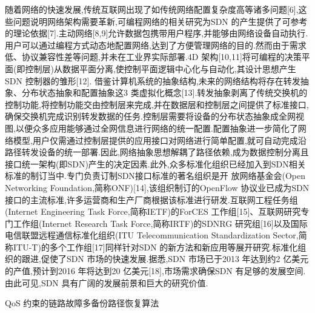 随着网络的快速发展,传统互联网出现了如传统网络配置复杂度高等诸多问题[6],这些问题说明网络架构需要革新,可编程网络的相关研究为SDN 的产生提供了可参考的理论依据[7].主动网络[8,9]允许数据包携带用户程序,并能够由网络设备自动执行.用户可以通过编程方式动态地配置网络,达到了方便管理网络的目的.然而由于需求低、协议兼容性差等问题,并未在工业界实际部署.4D 架构[10,11]将可编程的决策平面(即控制层)从数据平面分离,使控制平面逻辑中心化与自动化,其设计思想产生SDN 控制器的雏形[12].
借鉴计算机系统的抽象结构,未来的网络结构将存在转发抽象、分布状态抽象和配置抽象这3 类虚拟化概念[13].转发抽象剥离了传统交换机的控制功能,将控制功能交由控制层来完成,并在数据层和控制层之间提供了标准接口,确保交换机完成识别转发数据的任务.控制层需要将设备的分布状态抽象成全网视图,以便众多应用能够通过全网信息进行网络的统一配置.配置抽象进一步简化了网络模型,用户仅需通过控制层提供的应用接口对网络进行简单配置,就可自动完成沿路径转发设备的统一部署.因此,网络抽象思想解耦了路径依赖,成为数据控制分离且接口统一架构(即SDN)产生的决定因素.此外,众多标准化组织已经加入到SDN相关标准的制订当中.专门负责订制SDN接口标准的著名组织是开
放网络基金会(Open Networking Foundation,简称ONF)[14],该组织制订的OpenFlow 协议业已成为SDN 接口的主流标准,许多运营商和生产厂商根据该标准进行研发.互联网工程任务组(Internet Engineering Task Force,简称IETF)的ForCES 工作组[15]、互联网研究专门工作组(Internet Research Task Force,简称IRTF)的SDNRG 研究组[16]以及国际电信联盟远程通信标准化组织(ITU Telecommunication Standardization Sector,简称ITU-T)的多个工作组[17]同样针对SDN 的新方法和新应用等展开研究.标准化组织的跟进,促使了SDN 市场的快速发展.据悉,SDN 市场已于2013 年达到约2 亿美元的产值,预计到2016 年将达到20 亿美元[18],市场需求确保SDN 有足够的发展空间.由此可见,SDN 具有广阔的发展前景和巨大的研究价值.

QoS 约束的链路故障多备份路径恢复算法


